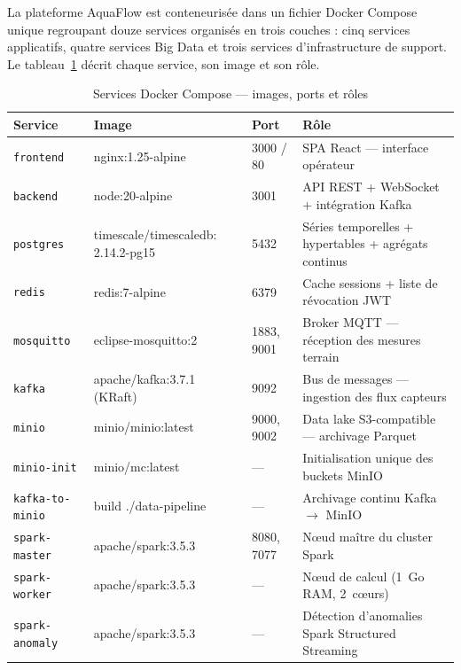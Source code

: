 La plateforme AquaFlow est conteneurisée dans un fichier Docker Compose unique
regroupant douze services organisés en trois couches : cinq services applicatifs,
quatre services Big Data et trois services d'infrastructure de support.
Le tableau~\ref{tab:services_docker} décrit chaque service, son image et son rôle.

\begin{table}[H]
	\centering
	\renewcommand{\arraystretch}{1.3}
	\caption{Services Docker Compose — images, ports et rôles}
	\begin{tabular}{|p{2.5cm}|p{3.8cm}|p{1.8cm}|p{4.8cm}|}
		\hline
		\textbf{Service} & \textbf{Image} & \textbf{Port} & \textbf{Rôle} \\
		\hline
		\texttt{frontend}
		& nginx:1.25-alpine
		& 3000 / 80
		& SPA React — interface opérateur \\
		\hline
		\texttt{backend}
		& node:20-alpine
		& 3001
		& API REST + WebSocket + intégration Kafka \\
		\hline
		\texttt{postgres}
		& timescale/timescaledb: 2.14.2-pg15
		& 5432
		& Séries temporelles + hypertables + agrégats continus \\
		\hline
		\texttt{redis}
		& redis:7-alpine
		& 6379
		& Cache sessions + liste de révocation JWT \\
		\hline
		\texttt{mosquitto}
		& eclipse-mosquitto:2
		& 1883, 9001
		& Broker MQTT — réception des mesures terrain \\
		\hline
		\texttt{kafka}
		& apache/kafka:3.7.1 (KRaft)
		& 9092
		& Bus de messages — ingestion des flux capteurs \\
		\hline
		\texttt{minio}
		& minio/minio:latest
		& 9000, 9002
		& Data lake S3-compatible — archivage Parquet \\
		\hline
		\texttt{minio-init}
		& minio/mc:latest
		& —
		& Initialisation unique des buckets MinIO \\
		\hline
		\texttt{kafka-to-minio}
		& build ./data-pipeline
		& —
		& Archivage continu Kafka $\to$ MinIO \\
		\hline
		\texttt{spark-master}
		& apache/spark:3.5.3
		& 8080, 7077
		& Nœud maître du cluster Spark \\
		\hline
		\texttt{spark-worker}
		& apache/spark:3.5.3
		& —
		& Nœud de calcul (1~Go RAM, 2~cœurs) \\
		\hline
		\texttt{spark-anomaly}
		& apache/spark:3.5.3
		& —
		& Détection d'anomalies Spark Structured Streaming \\
		\hline
	\end{tabular}
	\label{tab:services_docker}
\end{table}


